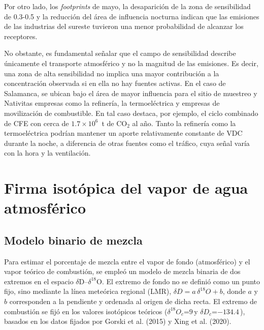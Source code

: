 Por otro lado, los \textit{footprints} de mayo, la desaparición de la zona 
de sensibilidad de 0.3-0.5 y la reducción del área de influencia nocturna indican que
las emisiones de las industrias del sureste tuvieron una menor probabilidad de alcanzar 
los receptores. 

No obstante, es fundamental señalar que el campo de sensibilidad describe 
únicamente el transporte atmosférico y no la magnitud de las emisiones. 
Es decir, una zona de alta sensibilidad no implica una mayor contribución a la
concentración observada si en ella no hay fuentes activas. En el caso de 
Salamanca, se ubican bajo el área de mayor influencia para el sitio 
de muestreo y Nativitas empresas como la refinería, la termoeléctrica y 
empresas de movilización de combustible. En tal caso destaca, por ejemplo, 
el ciclo combinado de CFE con cerca de  $1.7\times10^{6}$~t de CO$_2$ al año. 
Tanto la refinería como la termoeléctrica podrían mantener un aporte 
relativamente constante de VDC durante la noche, a diferencia de otras 
fuentes como el tráfico, cuya señal varía con la hora y la ventilación. 

\section{Firma isotópica del vapor de agua atmosférico}

\subsection{Modelo binario de mezcla}

Para estimar el porcentaje de mezcla entre el vapor de fondo (atmosférico) y 
el vapor teórico de combustión, se empleó un modelo de mezcla binaria de dos 
extremos en el espacio $\delta$D--$\delta^{18}$O. El extremo de fondo no se
definió como un punto fijo, sino mediante la línea meteórica regional (LMR),
$\delta D = a\,\delta^{18}O + b$, donde $a$ y $b$ corresponden a la 
pendiente y ordenada al origen de dicha recta. El extremo de combustión se
fijó en los valores isotópicos teóricos ($\delta^{18}O_c$=$9$\,\textpertenthousand y 
$\delta D_c$=$-134.4$\,\textperthousand), basados
en los datos fijados por Gorski et al. (2015) y Xing et al. (2020). 

